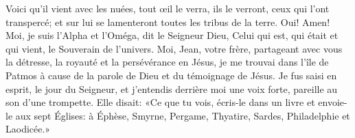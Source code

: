 Voici qu’il vient avec les nuées, tout œil le verra,
	ils le verront, ceux qui l’ont transpercé;
	et sur lui se lamenteront toutes les tribus de la terre. Oui! Amen!
Moi, je suis l’Alpha et l’Oméga, dit le Seigneur Dieu,
	Celui qui est, qui était et qui vient, le Souverain de l’univers.
Moi, Jean, votre frère,
	partageant avec vous la détresse, la royauté et la persévérance en Jésus,
	je me trouvai dans l’île de Patmos
	à cause de la parole de Dieu et du témoignage de Jésus.
Je fus saisi en esprit, le jour du Seigneur,
	et j’entendis derrière moi une voix forte, pareille au son d’une trompette.
Elle disait: «Ce que tu vois, écris-le dans un livre
	et envoie-le aux sept Églises:
	à Éphèse, Smyrne, Pergame, Thyatire, Sardes, Philadelphie et Laodicée.»
